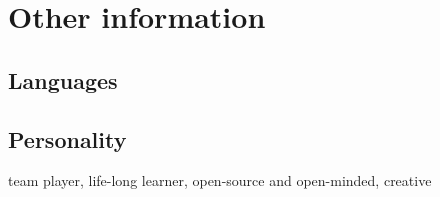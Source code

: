 \documentclass[letterpaper]{cv} %
\begin{document}
\section{Other information}

\subsection{Languages}
\begin{twentyshort} %
\end{twentyshort}

\subsection{Personality}
team player, life-long learner, open-source and open-minded, creative




%




\end{document}
